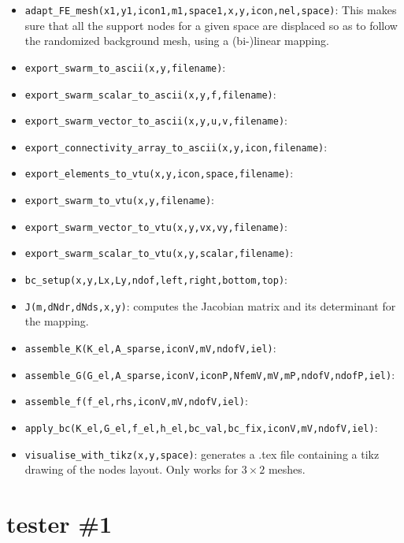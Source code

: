 \begin{itemize}
\begin{itemize}
\item \lstinline{adapt_FE_mesh(x1,y1,icon1,m1,space1,x,y,icon,nel,space)}: This makes sure that 
all the support nodes for a given space are displaced so as to follow the randomized 
background mesh, using a (bi-)linear mapping.

\item \lstinline{export_swarm_to_ascii(x,y,filename)}:
\item \lstinline{export_swarm_scalar_to_ascii(x,y,f,filename)}:
\item \lstinline{export_swarm_vector_to_ascii(x,y,u,v,filename)}:
\item \lstinline{export_connectivity_array_to_ascii(x,y,icon,filename)}:
\item \lstinline{export_elements_to_vtu(x,y,icon,space,filename)}:
\item \lstinline{export_swarm_to_vtu(x,y,filename)}:
\item \lstinline{export_swarm_vector_to_vtu(x,y,vx,vy,filename)}:
\item \lstinline{export_swarm_scalar_to_vtu(x,y,scalar,filename)}:
\item \lstinline{bc_setup(x,y,Lx,Ly,ndof,left,right,bottom,top)}:
\item \lstinline{J(m,dNdr,dNds,x,y)}: computes the Jacobian matrix and its determinant 
for the mapping. 
\item \lstinline{assemble_K(K_el,A_sparse,iconV,mV,ndofV,iel)}:
\item \lstinline{assemble_G(G_el,A_sparse,iconV,iconP,NfemV,mV,mP,ndofV,ndofP,iel)}:
\item \lstinline{assemble_f(f_el,rhs,iconV,mV,ndofV,iel)}:
\item \lstinline{apply_bc(K_el,G_el,f_el,h_el,bc_val,bc_fix,iconV,mV,ndofV,iel)}:
\item \lstinline{visualise_with_tikz(x,y,space)}: generates a .tex file containing 
a tikz drawing of the nodes layout. Only works for $3\times 2$ meshes. 
\end{itemize}

\end{itemize}

\newpage
\section*{tester \#1}

